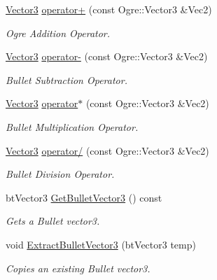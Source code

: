 \begin{DoxyCompactItemize}
\hyperlink{classphys_1_1Vector3}{Vector3} \hyperlink{classphys_1_1Vector3_a14ca2ae8bbe9ebefd298486b2a2ba5c9}{operator+} (const Ogre::Vector3 \&Vec2)
\begin{DoxyCompactList}\small\item\em Ogre Addition Operator. \item\end{DoxyCompactList}\item 
\hyperlink{classphys_1_1Vector3}{Vector3} \hyperlink{classphys_1_1Vector3_a54d5fc20ae502ac1443ddbb6cf1fbf1f}{operator-\/} (const Ogre::Vector3 \&Vec2)
\begin{DoxyCompactList}\small\item\em Bullet Subtraction Operator. \item\end{DoxyCompactList}\item 
\hyperlink{classphys_1_1Vector3}{Vector3} \hyperlink{classphys_1_1Vector3_a34014be39219a1ad3d4808b9614ac80d}{operator$\ast$} (const Ogre::Vector3 \&Vec2)
\begin{DoxyCompactList}\small\item\em Bullet Multiplication Operator. \item\end{DoxyCompactList}\item 
\hyperlink{classphys_1_1Vector3}{Vector3} \hyperlink{classphys_1_1Vector3_a4f9f3240dab2277e8a9b80f6c7235e5b}{operator/} (const Ogre::Vector3 \&Vec2)
\begin{DoxyCompactList}\small\item\em Bullet Division Operator. \item\end{DoxyCompactList}\item 
btVector3 \hyperlink{classphys_1_1Vector3_adf4129007ee41f5a03e97502f2df9c41}{GetBulletVector3} () const 
\begin{DoxyCompactList}\small\item\em Gets a Bullet vector3. \item\end{DoxyCompactList}\item 
void \hyperlink{classphys_1_1Vector3_a24ae86b068340be6727877f8c6c1a313}{ExtractBulletVector3} (btVector3 temp)
\begin{DoxyCompactList}\small\item\em Copies an existing Bullet vector3. \item\end{DoxyCompactList}\item 

\end{DoxyCompactItemize}
